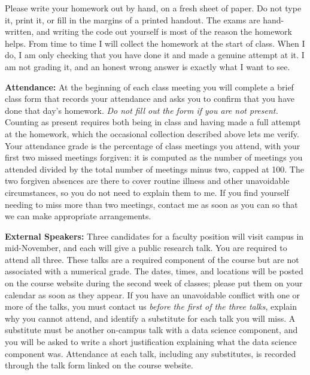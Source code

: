 \documentclass[11pt, a4paper]{article}
\begin{document}
\medskip

Please write your homework out by hand, on a fresh sheet of paper. Do not type it, print it, or fill in the margins of a printed handout. The exams are hand-written, and writing the code out yourself is most of the reason the homework helps. From time to time I will collect the homework at the start of class. When I do, I am only checking that you have done it and made a genuine attempt at it. I am not grading it, and an honest wrong answer is exactly what I want to see.

\bigskip

\textbf{Attendance:}
At the beginning of each class meeting you will complete a brief class form that records your attendance and asks you to confirm that you have done that day's homework. \textit{Do not fill out the form if you are not present.} Counting as present requires both being in class and having made a full attempt at the homework, which the occasional collection described above lets me verify. Your attendance grade is the percentage of class meetings you attend, with your first two missed meetings forgiven: it is computed as the number of meetings you attended divided by the total number of meetings minus two, capped at 100. The two forgiven absences are there to cover routine illness and other unavoidable circumstances, so you do not need to explain them to me. If you find yourself needing to miss more than two meetings, contact me as soon as you can so that we can make appropriate arrangements.

\bigskip

\textbf{External Speakers:}
Three candidates for a faculty position will visit campus in mid-November, and each will give a public research talk. You are required to attend all three. These talks are a required component of the course but are not associated with a numerical grade. The dates, times, and locations will be posted on the course website during the second week of classes; please put them on your calendar as soon as they appear. If you have an unavoidable conflict with one or more of the talks, you must contact us \textit{before the first of the three talks}, explain why you cannot attend, and identify a substitute for each talk you will miss. A substitute must be another on-campus talk with a data science component, and you will be asked to write a short justification explaining what the data science component was. Attendance at each talk, including any substitutes, is recorded through the talk form linked on the course website.
\end{document}
